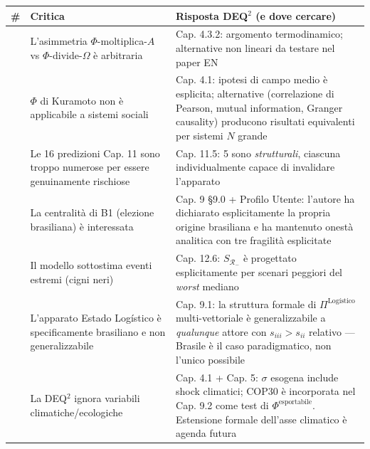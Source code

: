 {\def\LTcaptype{none} %
{\small\begin{longtable}[]{@{}
  >{\raggedright\arraybackslash}p{}
  >{\raggedright\arraybackslash}p{}
  >{\raggedright\arraybackslash}p{}@{}}
\toprule\noalign{}
\begin{minipage}[b]{\linewidth}\raggedright
\#
\end{minipage} & \begin{minipage}[b]{\linewidth}\raggedright
Critica
\end{minipage} & \begin{minipage}[b]{\linewidth}\raggedright
Risposta DEQ$^2$ (e dove cercare)
\end{minipage} \\
\midrule\noalign{}
\endhead
\bottomrule\noalign{}
\endlastfoot
1 & L'asimmetria \(\Phi\)-moltiplica-\(A\) vs \(\Phi\)-divide-\(\Omega\)
è arbitraria & Cap. 4.3.2: argomento termodinamico; alternative non
lineari da testare nel paper EN \\
2 & \(\Phi\) di Kuramoto non è applicabile a sistemi sociali & Cap. 4.1:
ipotesi di campo medio è esplicita; alternative (correlazione di
Pearson, mutual information, Granger causality) producono risultati
equivalenti per sistemi \(N\) grande \\
3 & Le 16 predizioni Cap. 11 sono troppo numerose per essere
genuinamente rischiose & Cap. 11.5: 5 sono \emph{strutturali}, ciascuna
individualmente capace di invalidare l'apparato \\
4 & La centralità di B1 (elezione brasiliana) è interessata & Cap. 9
\S{}9.0 + Profilo Utente: l'autore ha dichiarato esplicitamente la propria
origine brasiliana e ha mantenuto onestà analitica con tre fragilità
esplicitate \\
5 & Il modello sottostima eventi estremi (cigni neri) & Cap. 12.6:
\(S_{\mathcal{R}_-}\) è progettato esplicitamente per scenari peggiori
del \emph{worst} mediano \\
6 & L'apparato Estado Logístico è specificamente brasiliano e non
generalizzabile & Cap. 9.1: la struttura formale di
\(\Pi^{\text{Logístico}}\) multi-vettoriale è generalizzabile a
\emph{qualunque} attore con \(s_{iii} > s_{ii}\) relativo --- Brasile è
il caso paradigmatico, non l'unico possibile \\
7 & La DEQ$^2$ ignora variabili climatiche/ecologiche & Cap. 4.1 + Cap. 5:
\(\sigma\) esogena include shock climatici; COP30 è incorporata nel Cap.
9.2 come test di \(\Phi^{\text{esportabile}}\). Estensione formale
dell'asse climatico è agenda futura \\
\end{longtable}}
}


